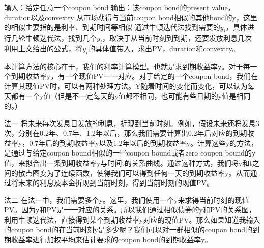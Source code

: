输入：给定任意一个coupon bond
输出：该coupon bond的present value， duration以及convexity
	从市场获得与当前coupon bond相似的其他bond的y，这里的相似主要指的是利率、到期时间等相似
	通过牛顿迭代法找到需要的$y_i$，具体进行几轮牛顿迭代法，找到几个$y_i$，取决于从当前时刻到到期，还要发放利息几次
	利用上文给出的公式，将$y_i$的具体值带入，求出PV，duration和convexity。

本计算方法的核心在于，我们的利率计算模型。也就是求到期收益率y。对于每一个到期收益率y，有一个现值PV一一对应。对于给定的一个coupon bond，我们在计算其现值PV时，可以有两种处理方法。Y随着时间的变化而变化，可以认为每天都有一个y值（但是不一定每天的y值都不相同，也可能有些日期的y值是相同的。）

法一
将未来每次发息日发放的利息，折现到当前时刻。例如，假设未来还将发息3次，分别在0.2年、0.7年、1.2年以后，那么我们需要计算出0.2年后对应的到期收益率y，0.7年后的到期收益率y以及1.2年以后的到期收益率y。计算这些y的方法，是通过与给定coupon bound相似的一些coupon bound或者zero coupon bound的y值，来拟合出一条到期收益率y与时间t的关系曲线。通过这种方式，我们将y和t之间的散点图变为了连续函数，使得我们可以得到任何一天的到期收益率y。从而通过将未来的利息及本金折现到当前时刻，得到当前时刻的现值PV。

法二
在法一中，我们需要多个y。这里，我们使用一个y来求得当前时刻的现值PV。因为y和PV是一一对应的关系。所以我们通过相似债券的y和PV的关系图，利用牛顿迭代法，直接得到某个到期收益率y对应的现值PV。那么如果知道我输入的coupon bond的在当前时刻y是多少呢？我们可以对一群相似的coupon bond的到期收益率进行加权平均来估计要求的coupon bond的到期收益率y。
